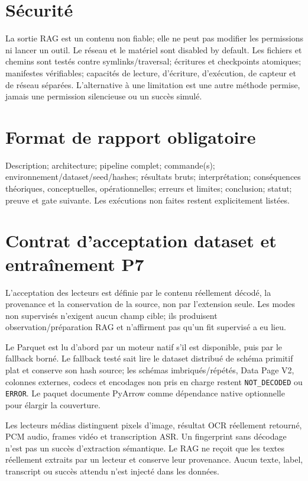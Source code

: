 \documentclass[11pt,a4paper]{report}
\begin{document}
\section{Sécurité}La sortie RAG est un contenu non fiable; elle ne peut pas modifier les permissions ni lancer un outil. Le réseau et le matériel sont disabled by default. Les fichiers et chemins sont testés contre symlinks/traversal; écritures et checkpoints atomiques; manifestes vérifiables; capacités de lecture, d'écriture, d'exécution, de capteur et de réseau séparées. L'alternative à une limitation est une autre méthode permise, jamais une permission silencieuse ou un succès simulé.
\section{Format de rapport obligatoire}Description; architecture; pipeline complet; commande(s); environnement/dataset/seed/hashes; résultats bruts; interprétation; conséquences théoriques, conceptuelles, opérationnelles; erreurs et limites; conclusion; statut; preuve et gate suivante. Les exécutions non faites restent explicitement listées.

\section{Contrat d'acceptation dataset et entraînement P7}
L'acceptation des lecteurs est définie par le contenu réellement décodé, la provenance et la conservation de la source, non par l'extension seule. Les modes non supervisés n'exigent aucun champ cible; ils produisent observation/préparation RAG et n'affirment pas qu'un fit supervisé a eu lieu.

Le Parquet est lu d'abord par un moteur natif s'il est disponible, puis par le fallback borné. Le fallback testé sait lire le dataset distribué de schéma primitif plat et conserve son hash source; les schémas imbriqués/répétés, Data Page V2, colonnes externes, codecs et encodages non pris en charge restent \texttt{NOT\_DECODED} ou \texttt{ERROR}. Le paquet documente PyArrow comme dépendance native optionnelle pour élargir la couverture.

Les lecteurs médias distinguent pixels d'image, résultat OCR réellement retourné, PCM audio, frames vidéo et transcription ASR. Un fingerprint sans décodage n'est pas un succès d'extraction sémantique. Le RAG ne reçoit que les textes réellement extraits par un lecteur et conserve leur provenance. Aucun texte, label, transcript ou succès attendu n'est injecté dans les données.
\end{document}
